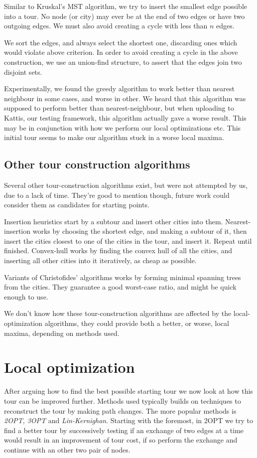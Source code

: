 \documentclass[a4paper,12pt,oneside]{article}
\begin{document}
Similar to Kruskal's MST algorithm, we try to insert the smallest edge possible into a tour. No node (or city) may ever be at the end of two edges or have two outgoing edges. We must also avoid creating a cycle with less than $n$ edges.

We sort the edges, and always select the shortest one, discarding ones which would violate above criterion. In order to avoid creating a cycle in the above construction, we use an union-find structure, to assert that the edges join two disjoint sets.

Experimentally, we found the greedy algorithm to work better than nearest neighbour in some cases, and worse in other. We heard that this algorithm was supposed to perform better than nearest-neighbour, but when uploading to Kattis, our testing framework, this algorithm actually gave a worse result. This may be in conjunction with how we perform our local optimizations etc. This initial tour seems to make our algorithm stuck in a worse local maxima.

\subsection{Other tour construction algorithms}

Several other tour-construction algorithms exist, but were not attempted by us, due to a lack of time. They're good to mention though, future work could consider them as candidates for starting points.

Insertion heuristics start by a subtour and insert other cities into them. Nearest-insertion works by choosing the shortest edge, and making a subtour of it, then insert the cities closest to one of the cities in the tour, and insert it. Repeat until finished. Convex-hull works by finding the convex hull of all the cities, and inserting all other cities into it iteratively, as cheap as possible.

Variants of Christofides' algorithms works by forming minimal spanning trees from the cities. They guarantee a good worst-case ratio, and might be quick enough to use.

We don't know how these tour-construction algorithms are affected by the local-optimization algorithms, they could provide both a better, or worse, local maxima, depending on methods used.

\section{Local optimization}
After arguing how to find the best possible starting tour we now look at how this tour can be improved further. Methods used typically builds on techniques to reconstruct the tour by making path changes. The more popular methods is \textit{2OPT, 3OPT} and \textit{Lin-Kernighan}. Starting with the foremost, in 2OPT we try to find a better tour by successively testing if an exchange of two edges at a time would result in an improvement of tour cost, if so perform the exchange and continue with an other two pair of nodes.
\end{document}
